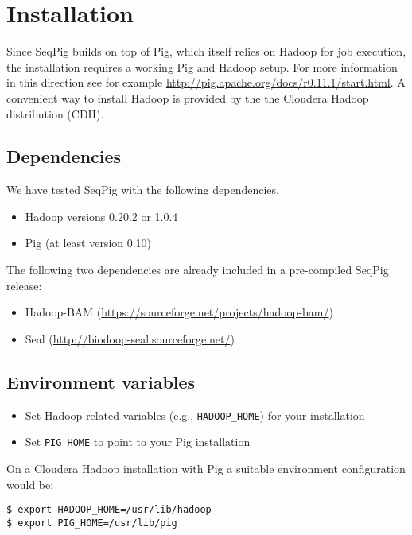 
\section{Installation}



Since SeqPig builds on top of Pig, which itself relies on Hadoop for
job execution, the installation requires a working Pig and Hadoop
setup. For more information in this direction see for example
\url{http://pig.apache.org/docs/r0.11.1/start.html}. A convenient way
to install Hadoop is provided by the the Cloudera Hadoop distribution
(CDH).

\subsection{Dependencies}
%
We have tested SeqPig with the following dependencies.
%
\begin{itemize}
	\item Hadoop versions 0.20.2 or 1.0.4
	\item Pig (at least version 0.10)
\end{itemize}
%
The following two dependencies are already included in a pre-compiled SeqPig release:
\begin{itemize}
\item Hadoop-BAM (\url{https://sourceforge.net/projects/hadoop-bam/})
\item Seal (\url{http://biodoop-seal.sourceforge.net/})
\end{itemize}

\subsection{Environment variables}
\label{sect:install_env}
\begin{itemize}
\item Set Hadoop-related variables (e.g., {\tt HADOOP\_HOME}) for your
	installation
\item Set {\tt PIG\_HOME} to point to your Pig installation
\end{itemize}

On a Cloudera Hadoop installation with Pig a suitable environment configuration would be:
\begin{lstlisting} 
$ export HADOOP_HOME=/usr/lib/hadoop
$ export PIG_HOME=/usr/lib/pig
\end{lstlisting}

